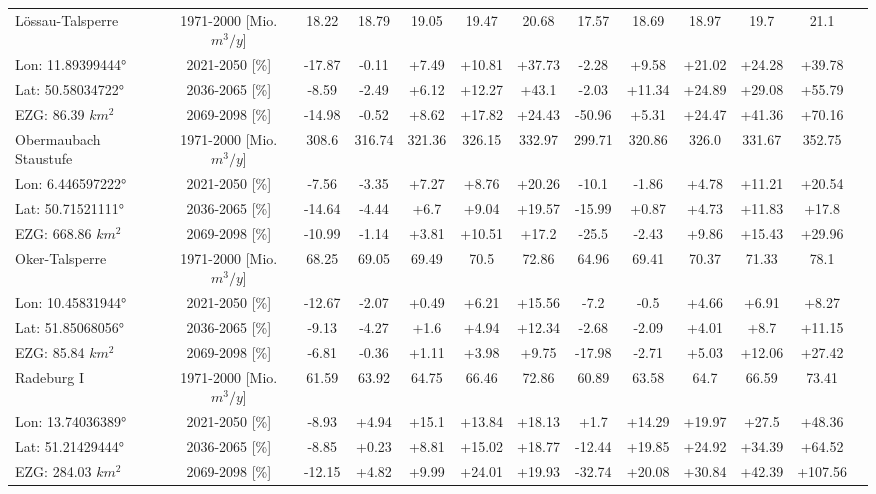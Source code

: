 \begin{longtable}{@{\extracolsep{\fill}}lc|ccccc||cccccc}
\hline 
Lössau-Talsperre & 1971-2000 [Mio. $m^3/y$]  & 18.22 & 18.79 & 19.05 & 19.47 & 20.68 & 17.57 & 18.69 & 18.97 & 19.7 & 21.1 & \\ 
\cline{2-13} 
Lon: 11.89399444° & 2021-2050 [\%]  & -17.87 & -0.11 & +7.49 & +10.81 & +37.73 & -2.28 & +9.58 & +21.02 & +24.28 & +39.78 & \\ 
Lat: 50.58034722° & 2036-2065 [\%]  & -8.59 & -2.49 & +6.12 & +12.27 & +43.1 & -2.03 & +11.34 & +24.89 & +29.08 & +55.79 & \\ 
EZG: 86.39 $km^2$ & 2069-2098 [\%]  & -14.98 & -0.52 & +8.62 & +17.82 & +24.43 & -50.96 & +5.31 & +24.47 & +41.36 & +70.16 & \\ 
\hline 
Obermaubach Staustufe & 1971-2000 [Mio. $m^3/y$]  & 308.6 & 316.74 & 321.36 & 326.15 & 332.97 & 299.71 & 320.86 & 326.0 & 331.67 & 352.75 & \\ 
\cline{2-13} 
Lon: 6.446597222° & 2021-2050 [\%]  & -7.56 & -3.35 & +7.27 & +8.76 & +20.26 & -10.1 & -1.86 & +4.78 & +11.21 & +20.54 & \\ 
Lat: 50.71521111° & 2036-2065 [\%]  & -14.64 & -4.44 & +6.7 & +9.04 & +19.57 & -15.99 & +0.87 & +4.73 & +11.83 & +17.8 & \\ 
EZG: 668.86 $km^2$ & 2069-2098 [\%]  & -10.99 & -1.14 & +3.81 & +10.51 & +17.2 & -25.5 & -2.43 & +9.86 & +15.43 & +29.96 & \\ 
\hline 
Oker-Talsperre & 1971-2000 [Mio. $m^3/y$]  & 68.25 & 69.05 & 69.49 & 70.5 & 72.86 & 64.96 & 69.41 & 70.37 & 71.33 & 78.1 & \\ 
\cline{2-13} 
Lon: 10.45831944° & 2021-2050 [\%]  & -12.67 & -2.07 & +0.49 & +6.21 & +15.56 & -7.2 & -0.5 & +4.66 & +6.91 & +8.27 & \\ 
Lat: 51.85068056° & 2036-2065 [\%]  & -9.13 & -4.27 & +1.6 & +4.94 & +12.34 & -2.68 & -2.09 & +4.01 & +8.7 & +11.15 & \\ 
EZG: 85.84 $km^2$ & 2069-2098 [\%]  & -6.81 & -0.36 & +1.11 & +3.98 & +9.75 & -17.98 & -2.71 & +5.03 & +12.06 & +27.42 & \\ 
\hline 
Radeburg I & 1971-2000 [Mio. $m^3/y$]  & 61.59 & 63.92 & 64.75 & 66.46 & 72.86 & 60.89 & 63.58 & 64.7 & 66.59 & 73.41 & \\ 
\cline{2-13} 
Lon: 13.74036389° & 2021-2050 [\%]  & -8.93 & +4.94 & +15.1 & +13.84 & +18.13 & +1.7 & +14.29 & +19.97 & +27.5 & +48.36 & \\ 
Lat: 51.21429444° & 2036-2065 [\%]  & -8.85 & +0.23 & +8.81 & +15.02 & +18.77 & -12.44 & +19.85 & +24.92 & +34.39 & +64.52 & \\ 
EZG: 284.03 $km^2$ & 2069-2098 [\%]  & -12.15 & +4.82 & +9.99 & +24.01 & +19.93 & -32.74 & +20.08 & +30.84 & +42.39 & +107.56 & \\ 

\end{longtable}
